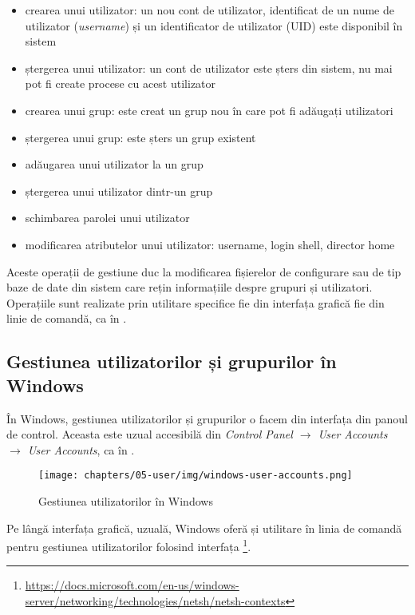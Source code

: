 \begin{itemize}
  \item crearea unui utilizator: un nou cont de utilizator, identificat de
    un nume de utilizator (\textit{username}) și un identificator de
          utilizator (UID) este disponibil în sistem
  \item ștergerea unui utilizator: un cont de utilizator este șters din
          sistem, nu mai pot fi create procese cu acest utilizator
  \item crearea unui grup: este creat un grup nou în care pot fi adăugați
          utilizatori
  \item ștergerea unui grup: este șters un grup existent
  \item adăugarea unui utilizator la un grup
  \item ștergerea unui utilizator dintr-un grup
  \item schimbarea parolei unui utilizator
  \item modificarea atributelor unui utilizator: username, login shell,
          director home
\end{itemize}

Aceste operații de gestiune duc la modificarea fișierelor de configurare sau de
tip baze de date din sistem care rețin informațiile despre grupuri și
utilizatori. Operațiile sunt realizate prin utilitare specifice fie din
interfața grafică fie din linie de comandă, ca în .

\subsection{Gestiunea utilizatorilor și grupurilor în Windows}
În Windows, gestiunea utilizatorilor și grupurilor o facem din interfața din
panoul de control. Aceasta este uzual accesibilă din \textit{Control Panel $\rightarrow$ User Accounts $\rightarrow$ User Accounts}, ca în .

\begin{figure}[!htbp]
  \centering
  \texttt{[image: chapters/05-user/img/windows-user-accounts.png]}
  \caption{Gestiunea utilizatorilor în Windows}
  \label{fig:user:windows-users}
\end{figure}

Pe lângă interfața grafică, uzuală, Windows oferă și utilitare în linia de
comandă pentru gestiunea utilizatorilor folosind interfața \footnote{\url{https://docs.microsoft.com/en-us/windows-server/networking/technologies/netsh/netsh-contexts}}.

